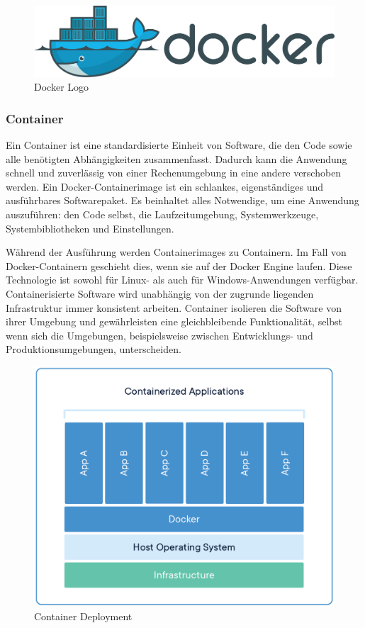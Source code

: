 \begin{figure}[h!]
    \centering
    \includegraphics[width=0.7\linewidth]{pics/docker-logo.png}
    \caption{Docker Logo}
    \label{fig:enter-label}
\end{figure}

\subsubsection{Container}
Ein Container ist eine standardisierte Einheit von Software, die den Code sowie alle benötigten Abhängigkeiten zusammenfasst. Dadurch kann die Anwendung schnell und zuverlässig von einer Rechenumgebung in eine andere verschoben werden. Ein Docker-Containerimage ist ein schlankes, eigenständiges und ausführbares Softwarepaket. Es beinhaltet alles Notwendige, um eine Anwendung auszuführen: den Code selbst, die Laufzeitumgebung, Systemwerkzeuge, Systembibliotheken und Einstellungen.\newline

Während der Ausführung werden Containerimages zu Containern. Im Fall von Docker-Containern geschieht dies, wenn sie auf der Docker Engine laufen. Diese Technologie ist sowohl für Linux- als auch für Windows-Anwendungen verfügbar. Containerisierte Software wird unabhängig von der zugrunde liegenden Infrastruktur immer konsistent arbeiten. Container isolieren die Software von ihrer Umgebung und gewährleisten eine gleichbleibende Funktionalität, selbst wenn sich die Umgebungen, beispielsweise zwischen Entwicklungs- und Produktionsumgebungen, unterscheiden.

\begin{figure}[h!]
    \centering
    \includegraphics[width=0.7\linewidth]{pics/docker-container.png}
    \caption{Container Deployment}
    \label{fig:enter-label}
\end{figure}

\cite{Vorteile_Nachteile_Docker}
\cite{Was_ist_Docker}




